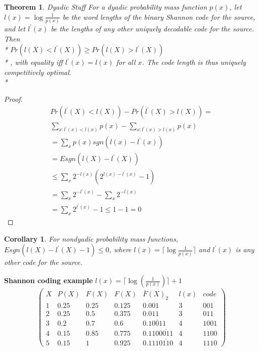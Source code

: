 \documentclass[10pt]{article}
\newtheorem{thm}{Theorem}[section]
\newtheorem{corollary}{Corollary}[section]
\begin{document}
\begin{tiny}
\begin{multicols}{3}
\begin{thm}{Dyadic Stuff} \label{thm: dyadic}
For a dyadic probability mass function $p(x)$, let $l(x) = \log \frac{1}{p(x)}$ be the word lengths of the binary Shannon code for the source, and let $l^{'}(x)$ be the lengths of any other uniquely decodable code for the source. Then \\*
$Pr(l(X) < l^{'}(X)) \geq Pr(l(X) > l^{'}(X))$ \\*
, with equality iff $l^{'}(x) = l(x)$ for all $x$. The code length is thus uniquely competitively optimal.\\*
\end{thm}
\begin{proof}
\begin{eqnarray}
Pr(l^{'}(X) < l(X)) - Pr(l^{'}(X) > l(X)) = \\
\sum_{x:l^{'}(x)<l(x)} p(x) - \sum_{x:l^{'}(x)>l(x)} p(x)\\
=\sum_x p(x)sgn(l(x) - l^{'}(x))\\
=E sgn(l(X) - l^{'}(X)) \\
\leq \sum_x 2^{-l(x)} (2^{l(x)-l^{'}(x)} - 1)\\
=\sum_x 2^{-l^{'}(x)} - \sum_x 2^{-l(x)} \\
=\sum_x 2^{l^{'}(x)} - 1 \leq 1-1 = 0 
\end{eqnarray}
\end{proof}
\begin{corollary}For nondyadic probability mass functions,
$E sgn(l(X) - l^{'}(X) - 1) \leq 0$, where $l(x) = \lceil \log \frac {1}{p(x)} \rceil$ and $l^{'}(x)$ is any other code for the source.
\end{corollary}

\textbf{\scriptsize Shannon coding example}
$l(x)= \lceil \log(\frac{1}{p(x)}) \rceil + 1$
\[
\begin{pmatrix}
      X & P(X) & F(X)  & F(X) & \bar{F}(X)_{2} & l(x) & code  \\
      1 & 0.25 & 0.25 & 0.125 & 0.001 & 3 & 001\\ 
      2 & 0.25 & 0.5 & 0.375 & 0.011 & 3 & 011\\ 
      3 & 0.2 & 0.7 & 0.6 & 0.\overline{10011} & 4 & 1001\\ 
      4 & 0.15 & 0.85 & 0.775 & 0.110 \overline{0011} & 4 & 1100\\ 
      5 & 0.15 & 1 & 0.925 & 0.111\overline{0110} & 4 & 1110
\end{pmatrix}
\]



\end{multicols}
\end{tiny}
\end{document}
